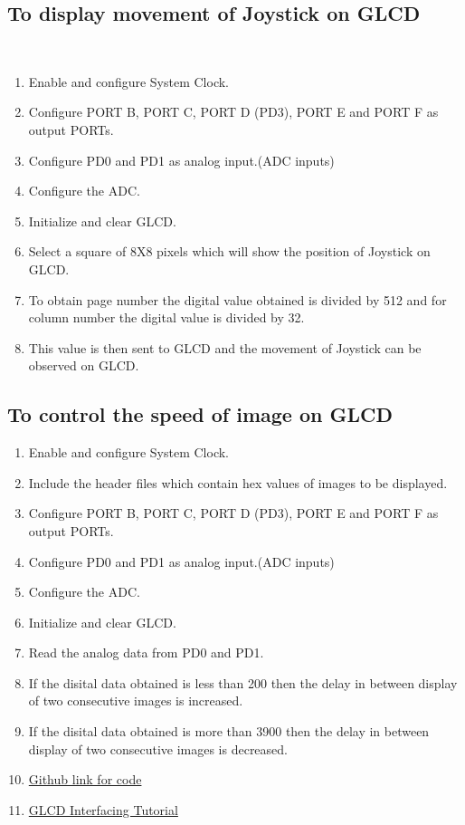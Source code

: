 \documentclass[a4paper,12pt,oneside]{book}
\begin{document}
\subsection{To display movement of Joystick on GLCD}\
\begin{enumerate}
\item Enable and configure System Clock.
\item Configure PORT B, PORT C, PORT D (PD3), PORT E and PORT F as output PORTs.
\item Configure PD0 and PD1 as analog input.(ADC inputs)
\item Configure the ADC.
\item Initialize and clear GLCD.
\item Select a square of 8X8 pixels which will show the position of Joystick on GLCD.
\item To obtain page number the digital value obtained is divided by 512 and for column number the digital value is divided by 32.
\item This value is then sent to GLCD and the movement of Joystick can be observed on GLCD.

\end{enumerate}

\subsection{To control the speed of image on GLCD}
\begin{enumerate}
\item Enable and configure System Clock.
\item Include the header files which contain hex values of images to be displayed.
\item Configure PORT B, PORT C, PORT D (PD3), PORT E and PORT F as output PORTs.
\item Configure PD0 and PD1 as analog input.(ADC inputs)
\item Configure the ADC.
\item Initialize and clear GLCD.
\item Read the analog data from PD0 and PD1. 
\item If the disital data obtained is less than 200 then the delay in between display of two consecutive images is increased.
\item If the disital data obtained is more than 3900 then the delay in between display of two consecutive images is decreased.
\item \href{https://github.com/eYSIP-2016/eYSIP-2016-Around-the-world-of-Embedded-Systems/tree/origin/master/Solutions/development\%20board/controlling\_moving\_images\_on\_glcd}{Github link for code}
\item \href{ http://10.129.139.139/videos/Interfacing_
GLCD_TIVA_Launchpad.html}{GLCD Interfacing Tutorial}
\end{enumerate}
\end{document}
